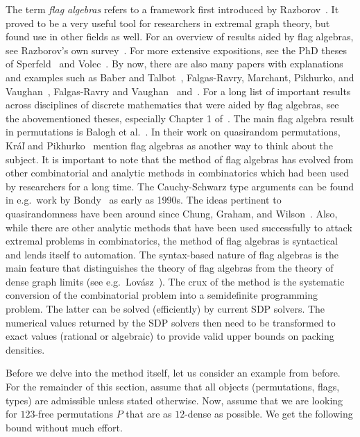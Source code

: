 \documentclass[12pt, a4paper, twoside]{report}
\begin{document}
The term \emph{flag algebras} refers to a framework first introduced by Razborov~\cite{razborov2007original}. It proved to be a very useful tool for researchers in extremal graph theory, but found use in other fields as well. For an overview of results aided by flag algebras, see Razborov's own survey~\cite{razborov2013interim}. For more extensive expositions, see the PhD theses of Sperfeld~\cite{sperfeld2012thesis} and Volec~\cite{volec2014thesis}. By now, there are also many papers with explanations and examples such as Baber and Talbot~\cite{babertalbot2011jump}, Falgas-Ravry, Marchant, Pikhurko, and Vaughan~\cite{pikhurko2015neighbourhoods}, Falgas-Ravry and Vaughan~\cite{falgasvaughan2012densities} and~\cite{falgas2013applications}. For a long list of important results across disciplines of discrete mathematics that were aided by flag algebras, see the abovementioned theses, especially Chapter 1 of~\cite{volec2014thesis}. The main flag algebra result in permutations is Balogh et al.~\cite{balogh2015minimum}. In their work on quasirandom permutations, Kr\'{a}\v{l} and Pikhurko~\cite{kral2013quasirandom} mention flag algebras as another way to think about the subject. It is important to note that the method of flag algebras has evolved from other combinatorial and analytic methods in combinatorics which had been used by researchers for a long time. The Cauchy-Schwarz type arguments can be found in e.g.~work by Bondy~\cite{bondy1997cs} as early as 1990s. The ideas pertinent to quasirandomness have been around since Chung, Graham, and Wilson~\cite{chung1988quasirandom}. Also, while there are other analytic methods that have been used successfully to attack extremal problems in combinatorics, the method of flag algebras is syntactical and lends itself to automation. The syntax-based nature of flag algebras is the main feature that distinguishes the theory of flag algebras from the theory of dense graph limits (see e.g.~Lov\'{a}sz~\cite{lovasz2012networks}). The crux of the method is the systematic conversion of the combinatorial problem into a semidefinite programming problem. The latter can be solved (efficiently) by current SDP solvers. The numerical values returned by the SDP solvers then need to be transformed to exact values (rational or algebraic) to provide valid upper bounds on packing densities.

Before we delve into the method itself, let us consider an example from before. For the remainder of this section, assume that all objects (permutations, flags, types) are admissible unless stated otherwise. Now, assume that we are looking for $123$-free permutations $P$ that are as $12$-dense as possible. We get the following bound without much effort.
\end{document}
